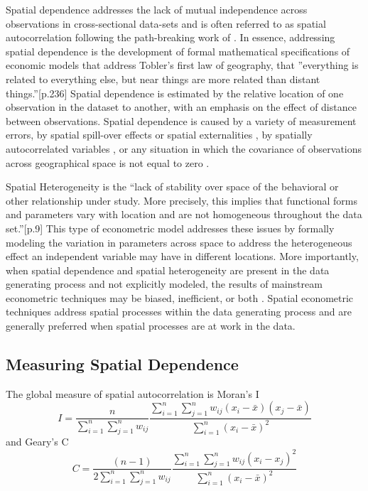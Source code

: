Spatial dependence addresses the lack of mutual independence across observations in cross-sectional data-sets and is often referred to as spatial autocorrelation following the path-breaking work of \cite{cliff1968, cliff1973}. In essence, addressing spatial dependence is the development of formal mathematical specifications of economic models that address Tobler's first law of geography, that ''everything is related to everything else, but near things are more related than distant things.''\citep{tobler1970}[p.236]  Spatial dependence is estimated by the relative location of one observation in the dataset to another, with an emphasis on the effect of distance between observations.  Spatial dependence is caused by a variety of measurement errors,  by spatial spill-over effects or spatial externalities \citep{Anselin1988}, by spatially autocorrelated variables \citep{Fingleton1999a}, or any situation in which the covariance of observations across geographical space is not equal to zero \citep{Anselin2001}.  

Spatial Heterogeneity is the ``lack of stability over space of the behavioral or other relationship under study.  More precisely, this implies that functional forms and parameters vary with location and are not homogeneous throughout the data set.''\citep{Anselin1988}[p.9]  This type of econometric model addresses these issues by formally modeling the variation in parameters across space to address the heterogeneous effect an independent variable may have in different locations.  More importantly, when spatial dependence and spatial heterogeneity are present in the data generating process and not explicitly modeled, the results of mainstream econometric techniques may be biased, inefficient, or both \cite{Anselin1988,LeSage2009}.  Spatial econometric techniques address spatial processes within the data generating process and are generally preferred when spatial processes are at work in the data.

\subsection{Measuring Spatial Dependence}

The global measure of spatial autocorrelation is Moran's I   \citep{Moran1950} 
\begin{equation}
I = \frac{n}{\sum^{n}_{i=1} \sum^{n}_{j=1} w_{ij}} \frac{\sum^{n}_{i=1} \sum^{n}_{j=1} w_{ij}(x_i - \bar{x})(x_j - \bar{x})}{\sum^{n}_{i=1}(x_i - \bar{x})^2}
\end{equation}
and Geary's C \citep{Geary1954}
\begin{equation}
C = \frac{(n-1)}{2\sum^{n}_{i=1} \sum^{n}_{j=1} w_{ij}} \frac{\sum^{n}_{i=1} \sum^{n}_{j=1} w_{ij}(x_i - x_j)^2}{\sum^{n}_{i=1}(x_i - \bar{x})^2}
\end{equation}

